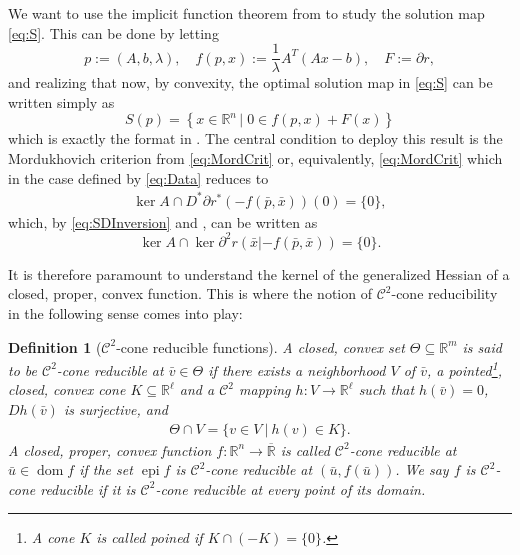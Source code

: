 \documentclass[reqno]{amsart}
\newtheorem{definition}[proposition]{Definition}
\numberwithin{equation}{section}
\newcommand{\R}{\mathbb{R}}
\newcommand{\U}{\mathbb{U}}
\newcommand{\V}{\mathbb{V}}
\newcommand{\W}{\mathbb{W}}
\newcommand{\set}[2]{\left\{#1\,\left\vert\; #2\right.\right\}}
\begin{document}
\noindent
We want to  use the implicit function theorem from  to study the solution map  \eqref{eq:S}.  This can be done by letting 
\begin{equation}\label{eq:Data}
p:=(A,b,\lambda), \quad f(p,x) := \frac{1}{\lambda} A^T(Ax - b), \quad F := \partial r,
\end{equation}
and realizing that now, by convexity, the optimal solution map in \eqref{eq:S}  can be written simply as 
\[
S(p)=\set{x\in \R^n}{ 0\in f(p,x)+F(x)}
\]
which is exactly the format in .
The central condition to deploy this result is the Mordukhovich criterion from \eqref{eq:MordCrit} or, equivalently, \eqref{eq:MordCrit} which  in the case defined by \eqref{eq:Data}  reduces to 
\begin{align*}
    \ker A \cap D^* \partial r^* (-f(\bar{p}, \bar{x}))(0) = \{0\},
\end{align*} 
which, by \eqref{eq:SDInversion} and \cite[Eq. 8(19)]{RoW 98},  can be written as 
\begin{equation}\label{eq:MordData}
    \ker A \cap \ker \partial^2 r(\bar{x} | -f(\bar{p}, \bar{x})) = \{0\}.
\end{equation}

\noindent
It is therefore paramount to understand the kernel of the generalized Hessian of a closed, proper, convex function.  
This is where the notion of $\mathcal{C}^2$-cone reducibility \cite[Definition 3.135]{BS 00} in the following sense comes into play:


\begin{definition}[$\mathcal{C}^2$-cone reducible functions]
    A closed, convex set $\Theta \subseteq \R^m$ is said to be $\mathcal{C}^2$-cone reducible
    at $\bar{v}\in \Theta$ if there exists a neighborhood $V$ of $\bar{v}$, a pointed\footnote{A cone $K$ is called poined if $K\cap (-K)=\{0\}$.}, closed, convex cone $K \subseteq \R^{\ell}$
    and a $\mathcal{C}^2$ mapping $h : V \to \R^{\ell}$ such that $h(\bar{v}) = 0$, $D h(\bar{v})$ is surjective, and \begin{align*}
        \Theta \cap V = \{v \in V \ | \ h(v) \in K\}. 
    \end{align*} A closed, proper, convex function $f : \R^n \to \overline{\R}$ is called $\mathcal{C}^2$-cone reducible at $\bar{u} \in \operatorname{dom}f$
    if the set $\operatorname{epi} f$ is $\mathcal{C}^2$-cone reducible at $(\bar{u}, f(\bar{u}))$. We say $f$ is $\mathcal{C}^2$-cone reducible
    if it is $\mathcal{C}^2$-cone reducible at every point of its domain.
\end{definition}
\end{document}
